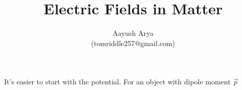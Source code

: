 \documentclass{article}
\title{Electric Fields in Matter}
\author{Aayush Arya\\ (tomriddle257@gmail.com)}
\begin{document}
	
	\maketitle
	
	It's easier to start with the potential. For an object with dipole moment $\vec{p}$
	
\end{document}
